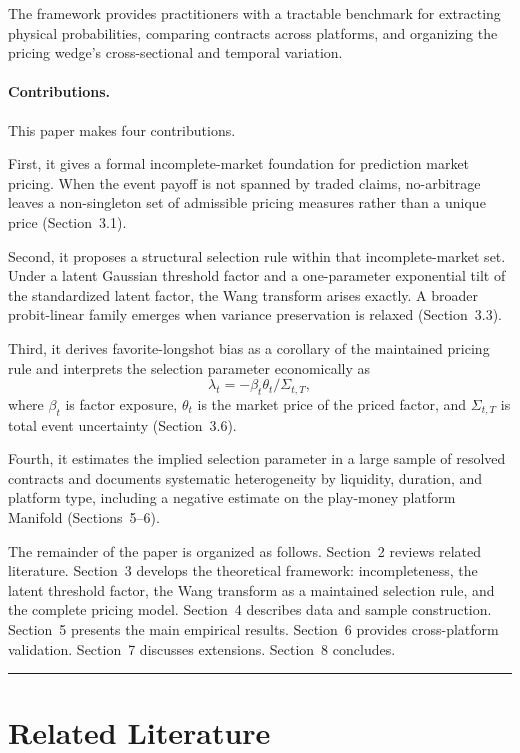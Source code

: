 \documentclass[12pt,a4paper]{article}
\begin{document}
The framework provides practitioners with a tractable benchmark for extracting physical probabilities, comparing contracts across platforms, and organizing the pricing wedge's cross-sectional and temporal variation.

\paragraph{Contributions.}
This paper makes four contributions.

First, it gives a formal incomplete-market foundation for prediction market pricing. When the event payoff is not spanned by traded claims, no-arbitrage leaves a non-singleton set of admissible pricing measures rather than a unique price (Section~3.1).

Second, it proposes a structural selection rule within that incomplete-market set. Under a latent Gaussian threshold factor and a one-parameter exponential tilt of the standardized latent factor, the Wang transform arises exactly. A broader probit-linear family emerges when variance preservation is relaxed (Section~3.3).

Third, it derives favorite-longshot bias as a corollary of the maintained pricing rule and interprets the selection parameter economically as
\[
\lambda_t = -\beta_t\theta_t/\Sigma_{t,T},
\]
where $\beta_t$ is factor exposure, $\theta_t$ is the market price of the priced factor, and $\Sigma_{t,T}$ is total event uncertainty (Section~3.6).

Fourth, it estimates the implied selection parameter in a large sample of resolved contracts and documents systematic heterogeneity by liquidity, duration, and platform type, including a negative estimate on the play-money platform Manifold (Sections~5--6).

\medskip

The remainder of the paper is organized as follows. Section~2 reviews related literature. Section~3 develops the theoretical framework: incompleteness, the latent threshold factor, the Wang transform as a maintained selection rule, and the complete pricing model. Section~4 describes data and sample construction. Section~5 presents the main empirical results. Section~6 provides cross-platform validation. Section~7 discusses extensions. Section~8 concludes.

\begin{center}\rule{0.5\linewidth}{0.5pt}\end{center}

\section{Related Literature}\label{related-literature}
\end{document}
